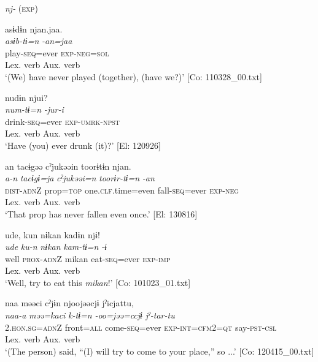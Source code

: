 \ea   \textit{nj-} (\textsc{exp}) \label{ex:9.10}

\ea %
 \gllll  asɨdɨn  njan.jaa.\\
      \textit{asɨb-tɨ=n}  \textit{-an=jaa}\\
      play-\textsc{seq}=ever  \textsc{exp}-\textsc{neg}=\textsc{sol}\\
      Lex. verb  Aux. verb\\
      \glt       ‘(We) have never played (together), (have we?)’ [Co: 110328\_00.txt]

\ex \label{ex:9.10b} %
      \gllll    nudɨn  njui?\\
      \textit{num-tɨ=n}  \textit{-jur-i}\\
      drink-\textsc{seq}=ever  \textsc{exp}-\textsc{umrk}-\textsc{npst}\\
      Lex. verb  Aux. verb\\
      \glt       ‘Have (you) ever drunk (it)?’ [El: 120926]

\ex \label{ex:9.10c} %
     \gllll an  tacɨgəə  cˀjukəəin  toorɨtɨn  njan.\\
      \textit{a-n}  \textit{tacɨgɨ=ja}  \textit{cˀjukəəi=n}  \textit{toorɨr-tɨ=n}  \textit{-an}\\
      \textsc{dist}-\textsc{adn}Z  prop=\textsc{top}  one.\textsc{clf}.time=even  fall-\textsc{seq}=ever  \textsc{exp}-\textsc{neg}\\
            Lex. verb  Aux. verb\\
      \glt       ‘That prop has never fallen even once.’ [El: 130816]

\ex \label{ex:9.10d} %
   \gllll   ude,  kun  nɨkan  kadɨn  njɨ!\\
      \textit{ude}  \textit{ku-n}  \textit{nɨkan}  \textit{kam-tɨ=n}  \textit{-ɨ}\\
      well  \textsc{prox}-\textsc{adn}Z  mikan  eat-\textsc{seq}=ever  \textsc{exp}-\textsc{imp}\\
            Lex. verb  Aux. verb\\
      \glt       ‘Well, try to eat this \textit{mikan}!’ [Co: 101023\_01.txt]

\ex \label{ex:9.10e} %
   \gllll naa  məəci  cˀjɨn  njoojəəcjɨ    jˀicjattu,\\
      \textit{naa-a}  \textit{məə=kaci}  \textit{k-tɨ=n}  \textit{-oo=jəə=ccjɨ}   \textit{jˀ-tar-tu}\\
      2.\textsc{hon}.\textsc{sg}=\textsc{adn}Z  front=\textsc{all}  come-\textsc{seq}=ever  \textsc{exp}-\textsc{int}=\textsc{cfm}2=\textsc{qt}  say-\textsc{pst}-\textsc{csl}\\
          Lex. verb  Aux. verb\\          
      \glt ‘(The person) said, “(I) will try to come to your place,” so ...’    [Co: 120415\_00.txt]
    \z
\z

